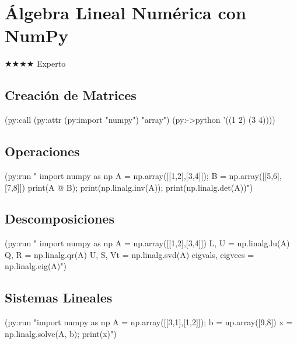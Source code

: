 \chapter{Álgebra Lineal Numérica con NumPy}
\label{chap:linear-algebra}
{\huge$\bigstar$}{\huge$\bigstar$}{\huge$\bigstar$}{\huge$\bigstar$} Experto

\section{Creación de Matrices}
\begin{lispcode}
(py:call (py:attr (py:import "numpy") "array") (py:->python '((1 2) (3 4))))
\end{lispcode}

\section{Operaciones}
\begin{lispcode}
(py:run "
import numpy as np
A = np.array([[1,2],[3,4]]); B = np.array([[5,6],[7,8]])
print(A @ B); print(np.linalg.inv(A)); print(np.linalg.det(A))")
\end{lispcode}

\section{Descomposiciones}
\begin{lispcode}
(py:run "
import numpy as np
A = np.array([[1,2],[3,4]])
L, U = np.linalg.lu(A)
Q, R = np.linalg.qr(A)
U, S, Vt = np.linalg.svd(A)
eigvals, eigvecs = np.linalg.eig(A)")
\end{lispcode}

\section{Sistemas Lineales}
\begin{lispcode}
(py:run "import numpy as np
A = np.array([[3,1],[1,2]]); b = np.array([9,8])
x = np.linalg.solve(A, b); print(x)")
\end{lispcode}

